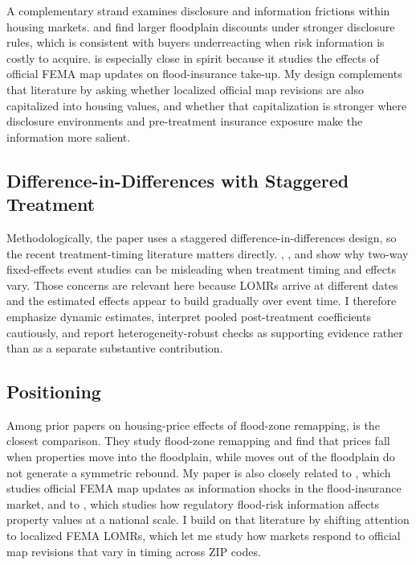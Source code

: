 \documentclass[12pt]{article}
\begin{document}
A complementary strand examines disclosure and information frictions within housing markets. \citet{TroyRomm2004} and \citet{Pope2008} find larger floodplain discounts under stronger disclosure rules, which is consistent with buyers underreacting when risk information is costly to acquire. \citet{Weill2023} is especially close in spirit because it studies the effects of official FEMA map updates on flood-insurance take-up. My design complements that literature by asking whether localized official map revisions are also capitalized into housing values, and whether that capitalization is stronger where disclosure environments and pre-treatment insurance exposure make the information more salient.

\subsection{Difference-in-Differences with Staggered Treatment}\label{sec:lit_did}

Methodologically, the paper uses a staggered difference-in-differences design, so the recent treatment-timing literature matters directly. \citet{GoodmanBacon2021}, \citet{SunAbraham2021}, and \citet{CallawaySantAnna2021} show why two-way fixed-effects event studies can be misleading when treatment timing and effects vary. Those concerns are relevant here because LOMRs arrive at different dates and the estimated effects appear to build gradually over event time. I therefore emphasize dynamic estimates, interpret pooled post-treatment coefficients cautiously, and report heterogeneity-robust checks as supporting evidence rather than as a separate substantive contribution.

\subsection{Positioning}\label{sec:lit_position}

Among prior papers on housing-price effects of flood-zone remapping, \citet{ShrZipp2019} is the closest comparison. They study flood-zone remapping and find that prices fall when properties move into the floodplain, while moves out of the floodplain do not generate a symmetric rebound. My paper is also closely related to \citet{Weill2023}, which studies official FEMA map updates as information shocks in the flood-insurance market, and to \citet{HinoBurke2021}, which studies how regulatory flood-risk information affects property values at a national scale. I build on that literature by shifting attention to localized FEMA LOMRs, which let me study how markets respond to official map revisions that vary in timing across ZIP codes.
\end{document}
